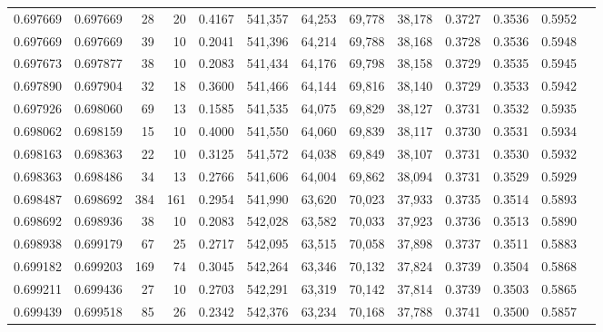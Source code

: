 \begin{tabular}{rrrrrrrrrrrrr}
0.697669 & 0.697669 &    28 &  20 &                                     0.4167 & 541,357 &  64,253 &  69,778 &  38,178 & 0.3727 & 0.3536 & 0.5952 \\
0.697669 & 0.697669 &    39 &  10 &                                     0.2041 & 541,396 &  64,214 &  69,788 &  38,168 & 0.3728 & 0.3536 & 0.5948 \\
0.697673 & 0.697877 &    38 &  10 &                                     0.2083 & 541,434 &  64,176 &  69,798 &  38,158 & 0.3729 & 0.3535 & 0.5945 \\
0.697890 & 0.697904 &    32 &  18 &                                     0.3600 & 541,466 &  64,144 &  69,816 &  38,140 & 0.3729 & 0.3533 & 0.5942 \\
0.697926 & 0.698060 &    69 &  13 &                                     0.1585 & 541,535 &  64,075 &  69,829 &  38,127 & 0.3731 & 0.3532 & 0.5935 \\
0.698062 & 0.698159 &    15 &  10 &                                     0.4000 & 541,550 &  64,060 &  69,839 &  38,117 & 0.3730 & 0.3531 & 0.5934 \\
0.698163 & 0.698363 &    22 &  10 &                                     0.3125 & 541,572 &  64,038 &  69,849 &  38,107 & 0.3731 & 0.3530 & 0.5932 \\
0.698363 & 0.698486 &    34 &  13 &                                     0.2766 & 541,606 &  64,004 &  69,862 &  38,094 & 0.3731 & 0.3529 & 0.5929 \\
0.698487 & 0.698692 &   384 & 161 &                                     0.2954 & 541,990 &  63,620 &  70,023 &  37,933 & 0.3735 & 0.3514 & 0.5893 \\
0.698692 & 0.698936 &    38 &  10 &                                     0.2083 & 542,028 &  63,582 &  70,033 &  37,923 & 0.3736 & 0.3513 & 0.5890 \\
0.698938 & 0.699179 &    67 &  25 &                                     0.2717 & 542,095 &  63,515 &  70,058 &  37,898 & 0.3737 & 0.3511 & 0.5883 \\
0.699182 & 0.699203 &   169 &  74 &                                     0.3045 & 542,264 &  63,346 &  70,132 &  37,824 & 0.3739 & 0.3504 & 0.5868 \\
0.699211 & 0.699436 &    27 &  10 &                                     0.2703 & 542,291 &  63,319 &  70,142 &  37,814 & 0.3739 & 0.3503 & 0.5865 \\
0.699439 & 0.699518 &    85 &  26 &                                     0.2342 & 542,376 &  63,234 &  70,168 &  37,788 & 0.3741 & 0.3500 & 0.5857 \\

\end{tabular}
